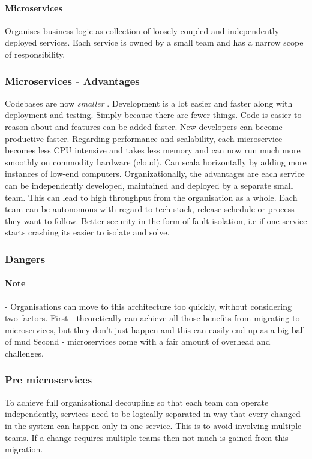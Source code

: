 \paragraph{Microservices}
Organises business logic as collection of loosely coupled and independently deployed services.
Each service is owned by a small team and has a narrow scope of responsibility.

\subsubsection{Microservices - Advantages}
Codebases are now \textit{smaller} .
Development is a lot easier and faster along with deployment and testing.
Simply because there are fewer things.
Code is easier to reason about and features can be added faster.
New developers can become productive faster.
Regarding performance and scalability, each microservice becomes less CPU intensive and takes less memory and can now run much more smoothly on commodity hardware (cloud).
Can scala horizontally by adding more instances of low-end computers.
Organizationally, the advantages are each service can be independently developed, maintained and deployed by a separate small team.
This can lead to high throughput from the organisation as a whole.
Each team can be autonomous with regard to tech stack, release schedule or process they want to follow.
Better security in the form of fault isolation, i.e if one service starts crashing its easier to isolate and solve.

\subsubsection{Dangers}

\paragraph{Note} - Organisations can move to this architecture too quickly, without considering two factors.
First - theoretically can achieve all those benefits from migrating to microservices, but they don't just happen and this can easily end up as a big ball of mud
Second - microservices come with a fair amount of overhead and challenges.

\subsubsection{Pre microservices}
To achieve full organisational decoupling so that each team can operate independently, services need to be logically separated in way that every changed in the system can happen only in one service.
This is to avoid involving multiple teams.
If a change requires multiple teams then not much is gained from this migration.

